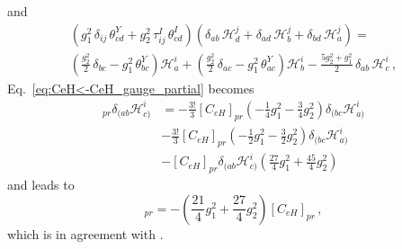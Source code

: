 and
\begin{multline}\label{eq:gauge_H_contraction}
    \left(g_1^2\,\delta_{ij}\,\theta^Y_{cd} + g_2^2\,\tau^I_{ij}\,\theta^I_{cd}\right)
    \left(\delta_{ab}\,\mathcal{H}^j_d + \delta_{ad}\,\mathcal{H}^j_b + \delta_{bd}\,\mathcal{H}^j_a\right)
    = \\ \left(\frac{g_2^2}{2}\,\delta_{bc} - g_1^2\,\theta^Y_{bc}\right)\mathcal{H}^i_a
    + \left(\frac{g_2^2}{2}\,\delta_{ac} - g_1^2\,\theta^Y_{ac}\right)\mathcal{H}^i_b
    - \frac{5g_2^2 + g_1^2}{2}\,\delta_{ab}\,\mathcal{H}^i_c\,,
\end{multline}
Eq.~\eqref{eq:CeH<-CeH_gauge_partial} becomes
\begin{align}
    [\dot C_{eH}]_{pr} \delta_{(ab}\mathcal H_{c)}^{i} &=-\frac{3!}{3} [ C_{eH}]_{pr} 
    \left(-\frac{1}{4}g_1^2    -\frac{3}{4} g_2^2  \right)\delta_{(bc}\mathcal H^i_{a)}
    \nonumber 
\\
    & - \frac{3!}{3}[C_{eH}]_{pr}   
    \left(-\frac{1}{2} g_1^2  - \frac{3}{2} g_2^2 \right)\delta_{(bc}\mathcal H^i_{a)}
    \nonumber \\
    & - [ C_{eH}]_{pr} \delta_{(ab}\mathcal H_{c)}^{i} \left(\frac{27}{4}g_1^2 + \frac{45}{4}g_2^2 \right)
\end{align}
and leads to
\begin{equation}
    [\dot C_{eH}]_{pr} = -\left(\frac{21}{4}g_1^2 + \frac{27}{4}g_2^2\right) [C_{eH}]_{pr} \,,
\end{equation}
which is in agreement with \cite{Alonso:2013hga}.

